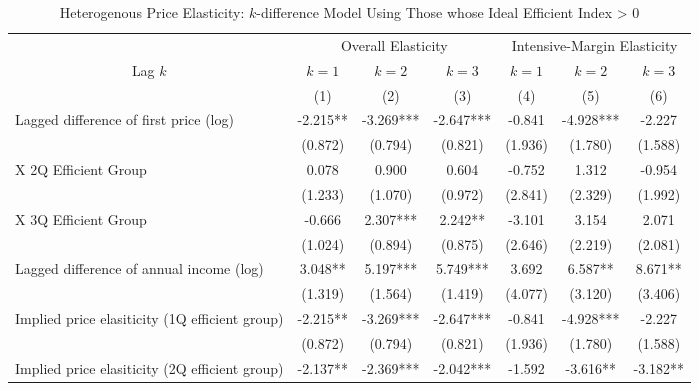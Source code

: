 \documentclass[ review  , 3p ]{elsarticle}
\begin{document}
  \begin{table}
  
  \caption{\label{tab:kableSubsetHeterokDiffElasticity}Heterogenous Price Elasticity: $k$-difference Model Using Those whose Ideal Efficient Index > 0}
  \centering
  \fontsize{8}{10}\selectfont
  \begin{threeparttable}
  \begin{tabular}[t]{lcccccc}
  \toprule
  \multicolumn{1}{c}{ } & \multicolumn{3}{c}{Overall Elasticity} & \multicolumn{3}{c}{Intensive-Margin Elasticity} \\
  \cmidrule(l{3pt}r{3pt}){2-4} \cmidrule(l{3pt}r{3pt}){5-7}
  \multicolumn{1}{c}{Lag $k$} & \multicolumn{1}{c}{$k = 1$} & \multicolumn{1}{c}{$k = 2$} & \multicolumn{1}{c}{$k = 3$} & \multicolumn{1}{c}{$k = 1$} & \multicolumn{1}{c}{$k = 2$} & \multicolumn{1}{c}{$k = 3$} \\
  \cmidrule(l{3pt}r{3pt}){1-1} \cmidrule(l{3pt}r{3pt}){2-2} \cmidrule(l{3pt}r{3pt}){3-3} \cmidrule(l{3pt}r{3pt}){4-4} \cmidrule(l{3pt}r{3pt}){5-5} \cmidrule(l{3pt}r{3pt}){6-6} \cmidrule(l{3pt}r{3pt}){7-7}
   & (1) & (2) & (3) & (4) & (5) & (6)\\
  \midrule
  Lagged difference of first price (log) & -2.215** & -3.269*** & -2.647*** & -0.841 & -4.928*** & -2.227\\
   & (0.872) & (0.794) & (0.821) & (1.936) & (1.780) & \vphantom{1} (1.588)\\
  \hspace{1em}X 2Q Efficient Group & 0.078 & 0.900 & 0.604 & -0.752 & 1.312 & -0.954\\
   & (1.233) & (1.070) & (0.972) & (2.841) & (2.329) & (1.992)\\
  \hspace{1em}X 3Q Efficient Group & -0.666 & 2.307*** & 2.242** & -3.101 & 3.154 & 2.071\\
   & (1.024) & (0.894) & (0.875) & (2.646) & (2.219) & (2.081)\\
  Lagged difference of annual income (log) & 3.048** & 5.197*** & 5.749*** & 3.692 & 6.587** & 8.671**\\
   & (1.319) & (1.564) & (1.419) & (4.077) & (3.120) & \vphantom{1} (3.406)\\
  Implied price elasiticity (1Q efficient group) & -2.215** & -3.269*** & -2.647*** & -0.841 & -4.928*** & -2.227\\
   & (0.872) & (0.794) & (0.821) & (1.936) & (1.780) & (1.588)\\
  Implied price elasiticity (2Q efficient group) & -2.137** & -2.369*** & -2.042*** & -1.592 & -3.616** & -3.182**\\

\end{tabular}
\end{threeparttable}
\end{table}
\end{document}
